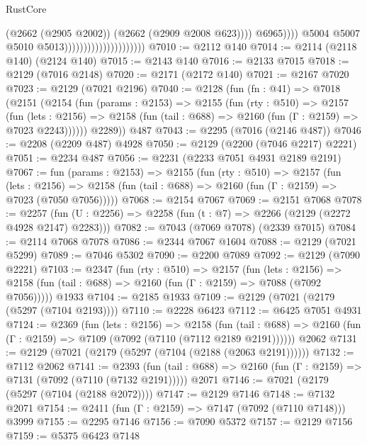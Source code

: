 \begin{lexlean}{RustCore}
\begin{coremodule}
                                                          (@2662 (@2905 @2002))
                                                          (@2662 (@2909 @2008 @623))))
                                                      @6965))))
                                              @5004
                                              @5007
                                              @5010
                                              @5013)))))))))))))))))))))
@7010 := @2112 @140
@7014 := @2114 (@2118 @140) (@2124 @140)
@7015 := @2143 @140
@7016 := @2133 @7015
@7018 := @2129 (@7016 @2148)
@7020 := @2171 (@2172 @140)
@7021 := @2167 @7020
@7023 := @2129 (@7021 @2196)
@7040 := @2128
    (fun (fn : @41) =>
    @7018
      (@2151
        (@2154
          (fun (params : @2153) =>
          @2155
            (fun (rty : @510) =>
            @2157
              (fun (lets : @2156) =>
              @2158 (fun (tail : @688) => @2160 (fun (Γ : @2159) => @7023 @2243))))))
        @2289))
    @487
@7043 := @2295 (@7016 (@2146 @487))
@7046 := @2208 (@2209 @487) @4928
@7050 := @2129 (@2200 (@7046 @2217) @2221)
@7051 := @2234 @487
@7056 := @2231 (@2233 @7051 @4931 @2189 @2191)
@7067 := fun (params : @2153) =>
  @2155
    (fun (rty : @510) =>
    @2157
      (fun (lets : @2156) =>
      @2158 (fun (tail : @688) => @2160 (fun (Γ : @2159) => @7023 (@7050 @7056)))))
@7068 := @2154 @7067
@7069 := @2151 @7068
@7078 := @2257 (fun (U : @2256) => @2258 (fun (t : @7) => @2266 (@2129 (@2272 @4928 @2147) @2283)))
@7082 := @7043 (@7069 @7078) (@2339 @7015)
@7084 := @2114 @7068 @7078
@7086 := @2344 @7067 @1604
@7088 := @2129 (@7021 @5299)
@7089 := @7046 @5302
@7090 := @2200 @7089
@7092 := @2129 (@7090 @2221)
@7103 := @2347
    (fun (rty : @510) =>
    @2157
      (fun (lets : @2156) =>
      @2158 (fun (tail : @688) => @2160 (fun (Γ : @2159) => @7088 (@7092 @7056)))))
    @1933
@7104 := @2185 @1933
@7109 := @2129 (@7021 (@2179 (@5297 (@7104 @2193))))
@7110 := @2228 @6423
@7112 := @6425 @7051 @4931
@7124 := @2369
    (fun (lets : @2156) =>
    @2158
      (fun (tail : @688) => @2160 (fun (Γ : @2159) => @7109 (@7092 (@7110 (@7112 @2189 @2191))))))
    @2062
@7131 := @2129 (@7021 (@2179 (@5297 (@7104 (@2188 (@2063 @2191))))))
@7132 := @7112 @2062
@7141 := @2393
    (fun (tail : @688) => @2160 (fun (Γ : @2159) => @7131 (@7092 (@7110 (@7132 @2191)))))
    @2071
@7146 := @7021 (@2179 (@5297 (@7104 (@2188 @2072))))
@7147 := @2129 @7146
@7148 := @7132 @2071
@7154 := @2411 (fun (Γ : @2159) => @7147 (@7092 (@7110 @7148))) @3999
@7155 := @2295 @7146
@7156 := @7090 @5372
@7157 := @2129 @7156
@7159 := @5375 @6423 @7148

\end{coremodule}
\end{lexlean}
